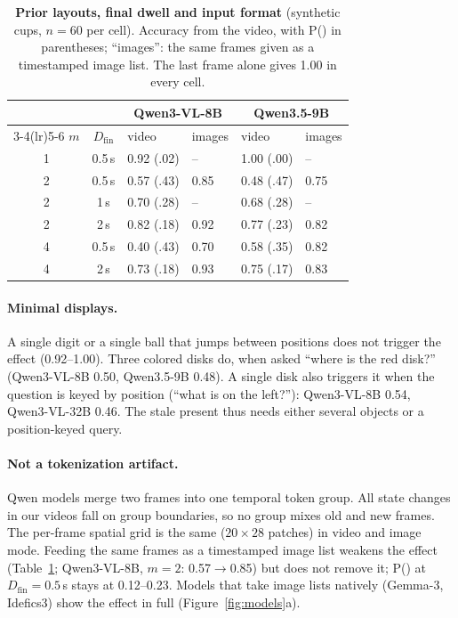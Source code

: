 \documentclass[10pt,twocolumn,letterpaper]{article}
\newcommand{\pstale}{P(\text{stale})}
\begin{document}
\begin{table}[t]
  \centering
  \small
  \caption{\textbf{Prior layouts, final dwell and input format} (synthetic cups, $n=60$ per cell). Accuracy from the video, with \pstale{} in parentheses; ``images'': the same frames given as a timestamped image list. The last frame alone gives 1.00 in every cell.}
  \label{tab:m}
  \setlength{\tabcolsep}{4pt}
  \begin{tabular}{ccllll}
    \toprule
    & & \multicolumn{2}{c}{Qwen3-VL-8B} & \multicolumn{2}{c}{Qwen3.5-9B} \\
    \cmidrule(lr){3-4}\cmidrule(lr){5-6}
    $m$ & $D_\text{fin}$ & video & images & video & images \\
    \midrule
    1 & 0.5\,s & 0.92 (.02) & -- & 1.00 (.00) & -- \\
    2 & 0.5\,s & 0.57 (.43) & 0.85 & 0.48 (.47) & 0.75 \\
    2 & 1\,s & 0.70 (.28) & -- & 0.68 (.28) & -- \\
    2 & 2\,s & 0.82 (.18) & 0.92 & 0.77 (.23) & 0.82 \\
    4 & 0.5\,s & 0.40 (.43) & 0.70 & 0.58 (.35) & 0.82 \\
    4 & 2\,s & 0.73 (.18) & 0.93 & 0.75 (.17) & 0.83 \\
    \bottomrule
  \end{tabular}
\end{table}

\paragraph{Minimal displays.} A single digit or a single ball that jumps between positions does not trigger the effect (0.92--1.00). Three colored disks do, when asked ``where is the red disk?'' (Qwen3-VL-8B 0.50, Qwen3.5-9B 0.48). A single disk also triggers it when the question is keyed by position (``what is on the left?''): Qwen3-VL-8B 0.54, Qwen3-VL-32B 0.46. The stale present thus needs either several objects or a position-keyed query.

\paragraph{Not a tokenization artifact.} Qwen models merge two frames into one temporal token group. All state changes in our videos fall on group boundaries, so no group mixes old and new frames. The per-frame spatial grid is the same ($20\times28$ patches) in video and image mode. Feeding the same frames as a timestamped image list weakens the effect (Table~\ref{tab:m}; Qwen3-VL-8B, $m=2$: 0.57$\to$0.85) but does not remove it; \pstale{} at $D_\text{fin}=0.5$\,s stays at 0.12--0.23. Models that take image lists natively (Gemma-3, Idefics3) show the effect in full (Figure~\ref{fig:models}a).
\end{document}
